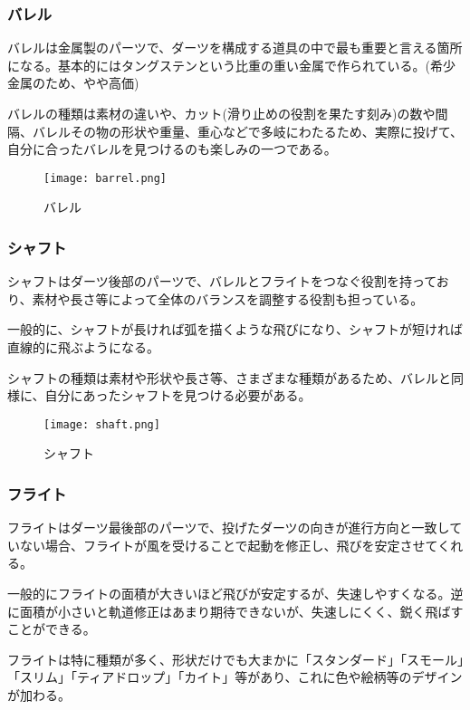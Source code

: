 \documentclass{jsarticle}
\begin{document}
\subsubsection{バレル}
バレルは金属製のパーツで、ダーツを構成する道具の中で最も重要と言える箇所になる。基本的にはタングステンという比重の重い金属で作られている。(希少金属のため、やや高価)

バレルの種類は素材の違いや、カット(滑り止めの役割を果たす刻み)の数や間隔、バレルその物の形状や重量、重心などで多岐にわたるため、実際に投げて、自分に合ったバレルを見つけるのも楽しみの一つである。
\begin{figure}[h]
\begin{center}
\texttt{[image: barrel.png]}
\caption{バレル}
\end{center}
\end{figure}

\newpage
\subsubsection{シャフト}
シャフトはダーツ後部のパーツで、バレルとフライトをつなぐ役割を持っており、素材や長さ等によって全体のバランスを調整する役割も担っている。

一般的に、シャフトが長ければ弧を描くような飛びになり、シャフトが短ければ直線的に飛ぶようになる。


シャフトの種類は素材や形状や長さ等、さまざまな種類があるため、バレルと同様に、自分にあったシャフトを見つける必要がある。
\begin{figure}[h]
\begin{center}
\texttt{[image: shaft.png]}
\caption{シャフト}
\end{center}
\end{figure}

\subsubsection{フライト}
フライトはダーツ最後部のパーツで、投げたダーツの向きが進行方向と一致していない場合、フライトが風を受けることで起動を修正し、飛びを安定させてくれる。

一般的にフライトの面積が大きいほど飛びが安定するが、失速しやすくなる。逆に面積が小さいと軌道修正はあまり期待できないが、失速しにくく、鋭く飛ばすことができる。

フライトは特に種類が多く、形状だけでも大まかに「スタンダード」「スモール」「スリム」「ティアドロップ」「カイト」等があり、これに色や絵柄等のデザインが加わる。
\end{document}
